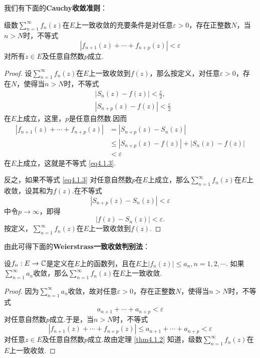 我们有下面的\textbf{Cauchy收敛准则}：
\begin{theorem}\label{thm4.1.2}
  级数$\sum_{n=1}^\infty f_n(z)$在$E$上一致收敛的充要条件是对任意$\varepsilon>0$，存在正整数$N$，当$n>N$时，不等式
  \begin{equation}\label{eq4.1.3}
    |f_{n+1}(z) + \cdots + f_{n+p}(z)| < \varepsilon
  \end{equation}
  对所有$z\in E$及任意自然数$p$成立.
\end{theorem}
\begin{proof}
  设$\sum_{n=1}^\infty f_n(z)$在$E$上一致收敛到$f(z)$，那么按定义，对任意$\varepsilon>0$，存在$N$，使得当$n>N$时，不等式
  \begin{align*}
    & |S_n(z) - f(z)| < \frac\varepsilon2,\\
    & |S_{n+p}(z) - f(z)| < \frac\varepsilon2
  \end{align*}
  在$E$上成立，这里，$p$是任意自然数.因而
  \begin{align*}
    |f_{n+1}(z) + \cdots + f_{n+p}(z)| & = |S_{n+p}(z) - S_n(z)|\\
    & \le |S_{n+p}(z) - f(z)| + |S_n(z) - f(z)|\\
    & < \varepsilon
  \end{align*}
  在$E$上成立，这就是不等式 \eqref{eq4.1.3}.

  反之，如果不等式 \eqref{eq4.1.3} 对任意自然数$p$在$E$上成立，那么$\sum_{n=1}^\infty f_n(z)$在$E$上收敛，设其和为$f(z)$.在不等式
  \[
    |S_{n+p}(z) - S_n(z)| < \varepsilon
  \]
  中令$p\to\infty$，即得
  \[
    |f(z) - S_n(z)| < \varepsilon.
  \]
  按定义，$\sum_{n=1}^\infty f_n(z)$在$E$上一致收敛到$f(z)$.
\end{proof}

由此可得下面的\textbf{Weierstrass一致收敛判别法}：
\begin{theorem}\label{thm4.1.3}
  设$f_n:E\to\mathbb C$是定义在$E$上的函数列，且在$E$上$|f_n(z)|\le a_n,n=1,2,\cdots$.
  如果$\sum_{n=1}^\infty a_n$收敛，那么$\sum_{n=1}^\infty f_n(z)$在$E$上一致收敛.
\end{theorem}
\begin{proof}
  因为$\sum_{n=1}^\infty a_n$收敛，故对任意$\varepsilon>0$，存在正整数$N$，使得当$n>N$时，不等式
  \[
    a_{n+1} + \cdots + a_{n+p} < \varepsilon
  \]
  对任意自然数$p$成立.于是，当$n>N$时，不等式
  \[
    |f_{n+1}(z) + \cdots + f_{n+p}(z)| \le  a_{n+1} + \cdots + a_{n+p} < \varepsilon
  \]
  对任意$z\in E$及任意自然数$p$成立.故由定理 \ref{thm4.1.2} 知道，级数$\sum_{n=1}^\infty f_n(z)$在$E$上一致收敛.
\end{proof}

